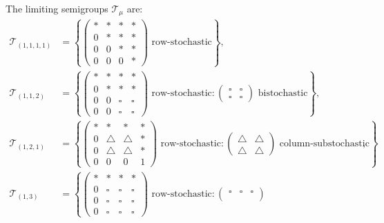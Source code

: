 \documentclass[11pt,a4paper,longbibliography]{amsart}
\numberwithin{equation}{section}
\theoremstyle{plain}
\theoremstyle{definition}
\theoremstyle{remark}
\begin{document}
	The limiting semigroups $\mathcal T_\mu$ are:
	\begin{align}
			\mathcal T_{(1,1,1,1)}&=
			\left\{
			\begin{pmatrix}
				* & * & * & *\\
				0 & * & * & *\\
				0 & 0 & * & *\\
				0 & 0 & 0 & *
			\end{pmatrix}
			\text{ row-stochastic}
			\right\},\\
			\mathcal T_{(1,1,2)}&=
			\left\{
			\begin{pmatrix}
				* & * & * & *\\
				0 & * & * & *\\
				0 & 0 & \square & \square\\
				0 & 0 & \square & \square
			\end{pmatrix}
			\text{ row-stochastic}
			\colon
			\begin{pmatrix}
				\square  & \square \\
				\square  & \square 
			\end{pmatrix}
			\text{  bistochastic}
			\right\},\nonumber\\
			\mathcal T_{(1,2,1)}&=
			\left\{
			\begin{pmatrix}
				* & * & * & *\\
				0 & \triangle & \triangle & *\\
				0 & \triangle & \triangle & *\\
				0 & 0 & 0 & 1
			\end{pmatrix}
			\text{ row-stochastic}
			\colon
			\begin{pmatrix}
				\triangle & \triangle\\
				\triangle & \triangle
			\end{pmatrix}
			\text{ column-substochastic}
			\right\},\nonumber\\
			\mathcal T_{(1,3)}&=
			\left\{
			\begin{pmatrix}
				* & * & * & *\\
				0 & \square &  \square &  \square\\
				0 & \square & \square &  \square\\
				0 &  \square &  \square &  \square
			\end{pmatrix}
			\text{ row-stochastic}
			\colon
			\begin{pmatrix}
				\square &  \square &  \square\\

\end{pmatrix}
\end{align}
\end{document}
